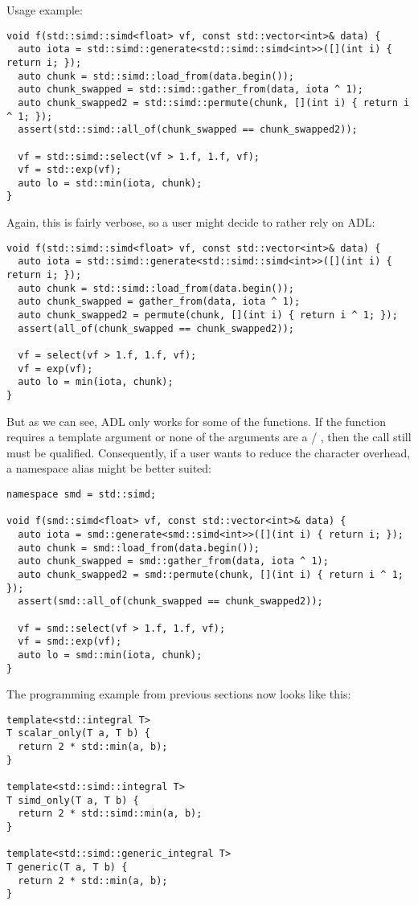Usage example:
\medskip\begin{lstlisting}[style=Vc]
void f(std::simd::simd<float> vf, const std::vector<int>& data) {
  auto iota = std::simd::generate<std::simd::simd<int>>([](int i) { return i; });
  auto chunk = std::simd::load_from(data.begin());
  auto chunk_swapped = std::simd::gather_from(data, iota ^ 1);
  auto chunk_swapped2 = std::simd::permute(chunk, [](int i) { return i ^ 1; });
  assert(std::simd::all_of(chunk_swapped == chunk_swapped2));

  vf = std::simd::select(vf > 1.f, 1.f, vf);
  vf = std::exp(vf);
  auto lo = std::min(iota, chunk);
}
\end{lstlisting}

Again, this is fairly verbose, so a user might decide to rather rely on ADL:
\medskip\begin{lstlisting}[style=Vc]
void f(std::simd::simd<float> vf, const std::vector<int>& data) {
  auto iota = std::simd::generate<std::simd::simd<int>>([](int i) { return i; });
  auto chunk = std::simd::load_from(data.begin());
  auto chunk_swapped = gather_from(data, iota ^ 1);
  auto chunk_swapped2 = permute(chunk, [](int i) { return i ^ 1; });
  assert(all_of(chunk_swapped == chunk_swapped2));

  vf = select(vf > 1.f, 1.f, vf);
  vf = exp(vf);
  auto lo = min(iota, chunk);
}
\end{lstlisting}

But as we can see, ADL only works for some of the functions.
If the function requires a template argument or none of the arguments are a
\simd / \mask, then the call still must be qualified.
Consequently, if a user wants to reduce the character overhead, a namespace
alias might be better suited:
\medskip\begin{lstlisting}[style=Vc]
namespace smd = std::simd;

void f(smd::simd<float> vf, const std::vector<int>& data) {
  auto iota = smd::generate<smd::simd<int>>([](int i) { return i; });
  auto chunk = smd::load_from(data.begin());
  auto chunk_swapped = smd::gather_from(data, iota ^ 1);
  auto chunk_swapped2 = smd::permute(chunk, [](int i) { return i ^ 1; });
  assert(smd::all_of(chunk_swapped == chunk_swapped2));

  vf = smd::select(vf > 1.f, 1.f, vf);
  vf = smd::exp(vf);
  auto lo = smd::min(iota, chunk);
}
\end{lstlisting}

The \simdgeneric programming example from previous sections now looks like
this:
\medskip\begin{lstlisting}[style=Vc]
template<std::integral T>
T scalar_only(T a, T b) {
  return 2 * std::min(a, b);
}

template<std::simd::integral T>
T simd_only(T a, T b) {
  return 2 * std::simd::min(a, b);
}

template<std::simd::generic_integral T>
T generic(T a, T b) {
  return 2 * std::min(a, b);
}
\end{lstlisting}

